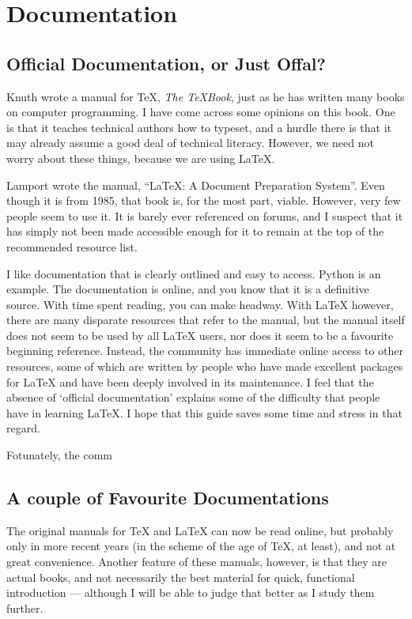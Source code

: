 \documentclass[11pt, oneside]{memoir}
\begin{document}
\chapter{Documentation}
\section{Official Documentation, or Just Offal?}

Knuth wrote a manual for TeX, \emph{The TeXBook}, just as he has written many books on computer programming. I have come across some opinions on this book. One is that it teaches technical authors how to typeset, and a hurdle there is that it may already assume a good deal of technical literacy. However, we need not worry about these things, because we are using LaTeX.

Lamport wrote the manual, ``LaTeX: A Document Preparation System''. Even though it is from 1985, that book is, for the most part, viable. However, very few people seem to use it. It is barely ever referenced on forums, and I suspect that it has simply not been made accessible enough for it to remain at the top of the recommended resource list. 

I like documentation that is clearly outlined and easy to access. Python is an example. The documentation is online, and you know that it is a definitive source. With time spent reading, you can make headway. With LaTeX however, there are many disparate resources that refer to the manual, but the manual itself does not seem to be used by all LaTeX users, nor does it seem to be a favourite beginning reference. Instead, the community has immediate online access to other resources, some of which are written by people who have made excellent packages for LaTeX and have been deeply involved in its maintenance. I feel that the absence of `official documentation' explains some of the difficulty that people have in learning LaTeX. I hope that this guide saves some time and stress in that regard.

Fotunately, the comm

\section{A couple of Favourite Documentations}
The original manuals for TeX and LaTeX can now be read online, but probably only in more recent years (in the scheme of the age of TeX, at least), and not at great convenience. Another feature of these manuals, however, is that they are actual books, and not necessarily the best material for quick, functional introduction — although I will be able to judge that better as I study them further.
\end{document}
